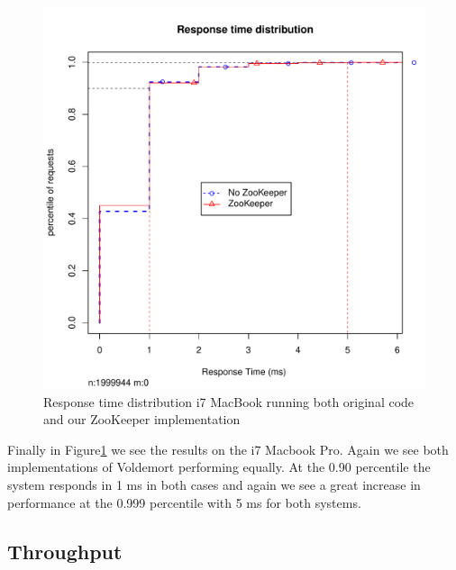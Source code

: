 \begin{figure}[h]
    \centering
    \includegraphics[width=1.0\textwidth]{results/distribution/distribution_eivind}
    \caption{Response time distribution i7 MacBook running both original code and our ZooKeeper implementation}
    \label{fig:dist_eivind}
\end{figure}

Finally in Figure\ref{fig:dist_eivind} we see the results on the i7 Macbook Pro. Again we see both implementations of Voldemort performing equally. At the 0.90 percentile the system responds in 1 ms in both cases and again we see a great increase in performance at the 0.999 percentile with 5 ms for both systems.

\subsection{Throughput}






